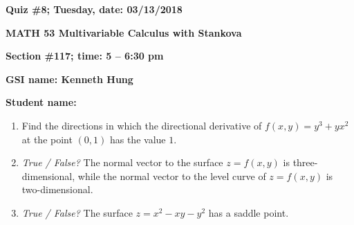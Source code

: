\documentclass{article}
\begin{document}
{\bf Quiz \#8; Tuesday, date: 03/13/2018}

{\bf MATH 53 Multivariable Calculus with Stankova}

{\bf Section \#117; time: 5 -- 6:30 pm}

{\bf GSI name: Kenneth Hung}

{\bf Student name:}

\vspace*{0.25in}

\begin{enumerate}
\item Find the directions in which the directional derivative of $f(x, y) = y^3 + y x^2$ at the point $(0, 1)$ has the value $1$.

\item {\em True / False?} The normal vector to the surface $z = f(x, y)$ is three-dimensional, while the normal vector to the level curve of $z = f(x, y)$ is two-dimensional.

\item {\em True / False?} The surface $z = x^2 - xy - y^2$ has a saddle point.
\end{enumerate}
\end{document}
